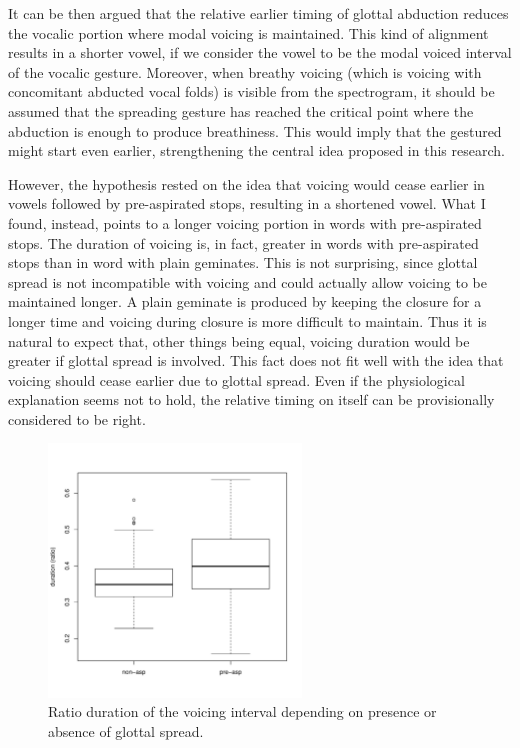 \documentclass[11pt,a4paper,openany]{memoir}\usepackage[]{graphicx}\usepackage[]{color}
\newenvironment{knitrout}{}{} %
\begin{document}
It can be then argued that the relative earlier timing of glottal abduction reduces the vocalic portion where modal voicing is maintained.
This kind of alignment results in a shorter vowel, if we consider the vowel to be the modal voiced interval of the vocalic gesture.
Moreover, when breathy voicing (which is voicing with concomitant abducted vocal folds) is visible from the spectrogram, it should be assumed that the spreading gesture has reached the critical point where the abduction is enough to produce breathiness.
This would imply that the gestured might start even earlier, strengthening the central idea proposed in this research.

However, the hypothesis rested on the idea that voicing would cease earlier in vowels followed by pre-aspirated stops, resulting in a shortened vowel.
What I found, instead, points to a longer voicing portion in words with pre-aspirated stops.
The duration of voicing is, in fact, greater in words with pre-aspirated stops than in word with plain geminates.
This is not surprising, since glottal spread is not incompatible with voicing and could actually allow voicing to be maintained longer.
A plain geminate is produced by keeping the closure for a longer time and voicing during closure is more difficult to maintain.
Thus it is natural to expect that, other things being equal, voicing duration would be greater if glottal spread is involved.
This fact does not fit well with the idea that voicing should cease earlier due to glottal spread.
Even if the physiological explanation seems not to hold, the relative timing on itself can be provisionally considered to be right.

\begin{figure}
\centering
\begin{knitrout}
\color{fgcolor}
\includegraphics[width=0.6\textwidth]{img/voic-stop-1} 

\end{knitrout}
\caption{Ratio duration of the voicing interval depending on presence or absence of glottal spread.}
\label{f:voicdur}
\end{figure}
\end{document}
